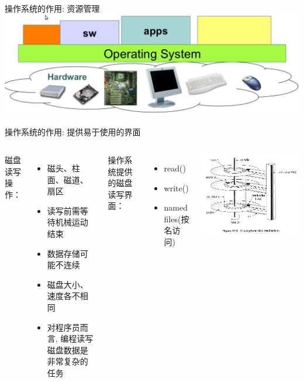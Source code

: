 \documentclass[xcolor=svgnames]{beamer}
\begin{document}
\begin{CJK*}{UTF8}{gbsn}
\begin{frame}{操作系统的作用: 资源管理}
\includegraphics[width=1.0\textwidth]{os-function.png}
\end{frame}

\begin{frame}{操作系统的作用: 提供易于使用的界面}
\begin{columns}
磁盘读写操作：
\begin{itemize}
\item 磁头、柱面、磁道、扇区
\item 读写前需等待机械运动结束
\item 数据存储可能不连续
\item 磁盘大小、速度各不相同
\item 对程序员而言, 编程读写磁盘数据是非常复杂的任务
\end{itemize}

操作系统提供的磁盘读写界面：
\begin{itemize}
\item read()
\item write()
\item named files(按名访问)
\end{itemize}

\includegraphics[width=1.0\textwidth]{disk.jpg}
\end{columns}
\end{frame}


\end{CJK*}
\end{document}

